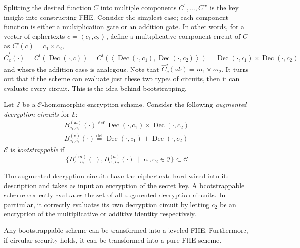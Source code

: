 Splitting the desired function $C$ into multiple components $C^1, \dots, C^m$ is the key insight into constructing FHE. Consider the simplest case; each component function is either a multiplication gate or an addition gate. In other words, for a vector of ciphertexts $c = \left\langle c_1, c_2 \right\rangle$, define a multiplicative component circuit of $C$ as $C^i(c) = c_1 \times c_2$, $\hat{C}^i_c(\cdot) = C^i(\operatorname{Dec}(\cdot, c)) = C^i(\left\langle \operatorname{Dec}(\cdot, c_1), \operatorname{Dec}(\cdot, c_2) \right\rangle) = \operatorname{Dec}(\cdot, c_1) \times \operatorname{Dec}(\cdot, c_2)$ and where the addition case is analogous. Note that $\hat{C}^i_c(sk) = m_1 \times m_2$. It turns out that if the scheme can evaluate just these two types of circuits, then it can evaluate every circuit. This is the idea behind bootstrapping.
\begin{definition}
    \label{def:bootstrappable}
    Let $\mathcal{E}$ be a $\mathcal{C}$-homomorphic encryption scheme. Consider the following \emph{augmented decryption circuits} for $\mathcal{E}$:
    \begin{equation*}
    \begin{aligned}        
        B_{c_1,c_2}^{(m)}(\cdot) \stackrel{\mathrm{def}}{=} \operatorname{Dec}(\cdot, c_1) \times \operatorname{Dec}(\cdot, c_2)\\
        B_{c_1,c_2}^{(a)}(\cdot) \stackrel{\mathrm{def}}{=} \operatorname{Dec}(\cdot, c_1) + \operatorname{Dec}(\cdot, c_2)
    \end{aligned}
    \end{equation*}
    $\mathcal{E}$ is \emph{bootstrappable} if
    \begin{equation*}
    \{B_{c_1,c_2}^{(m)}(\cdot), B_{c_1,c_2}^{(a)}(\cdot) \; \mid \; c_1, c_2 \in \mathcal{Y}\} \subset \mathcal{C}
    \end{equation*}
\end{definition}
The augmented decryption circuits have the ciphertexts hard-wired into its description and takes as input an encryption of the secret key. A bootstrappable scheme correctly evaluates the set of all augmented decryption circuits. In particular, it correctly evaluates its own decryption circuit by letting $c_2$ be an encryption of the multiplicative or additive identity respectively.
\begin{theorem}
Any bootstrappable scheme can be transformed into a leveled FHE. Furthermore, if circular security holds, it can be transformed into a pure FHE scheme.
\end{theorem}

